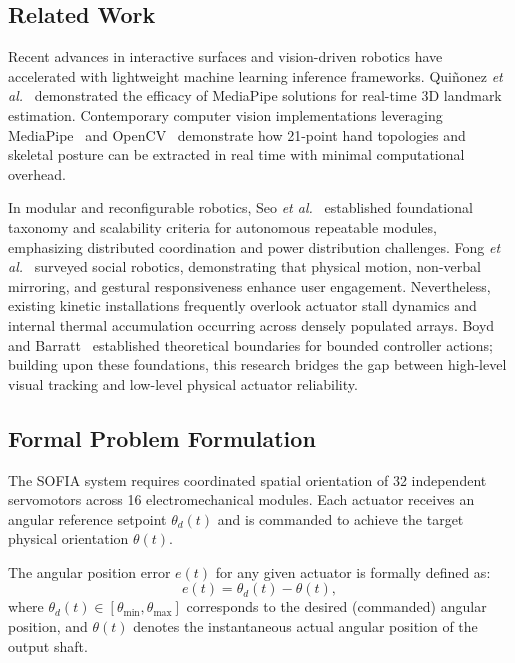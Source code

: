 \documentclass[lettersize,journal]{IEEEtran}
\begin{document}
\subsection{Related Work}
\label{sec:related_work}

Recent advances in interactive surfaces and vision-driven robotics have accelerated with lightweight machine learning inference frameworks. Qui{\~n}onez \textit{et al.}~\cite{quinonez2022mediapipe} demonstrated the efficacy of MediaPipe solutions for real-time 3D landmark estimation. Contemporary computer vision implementations leveraging MediaPipe~\cite{innovatiana2026mediapipe} and OpenCV~\cite{opencv2026library,omes2026deteccion} demonstrate how 21-point hand topologies and skeletal posture can be extracted in real time with minimal computational overhead. 

In modular and reconfigurable robotics, Seo \textit{et al.}~\cite{seo2019modular} established foundational taxonomy and scalability criteria for autonomous repeatable modules, emphasizing distributed coordination and power distribution challenges. Fong \textit{et al.}~\cite{fong2003social} surveyed social robotics, demonstrating that physical motion, non-verbal mirroring, and gestural responsiveness enhance user engagement. Nevertheless, existing kinetic installations frequently overlook actuator stall dynamics and internal thermal accumulation occurring across densely populated arrays. Boyd and Barratt~\cite{boyd1991linear} established theoretical boundaries for bounded controller actions; building upon these foundations, this research bridges the gap between high-level visual tracking and low-level physical actuator reliability.

\subsection{Formal Problem Formulation}
\label{sec:problem_formulation}

The SOFIA system requires coordinated spatial orientation of 32 independent servomotors across 16 electromechanical modules. Each actuator receives an angular reference setpoint $\theta_d(t)$ and is commanded to achieve the target physical orientation $\theta(t)$.

The angular position error $e(t)$ for any given actuator is formally defined as:
\begin{equation}
e(t) = \theta_d(t) - \theta(t),
\label{eq:position_error}
\end{equation}
where $\theta_d(t) \in [\theta_{\min}, \theta_{\max}]$ corresponds to the desired (commanded) angular position, and $\theta(t)$ denotes the instantaneous actual angular position of the output shaft.
\end{document}
